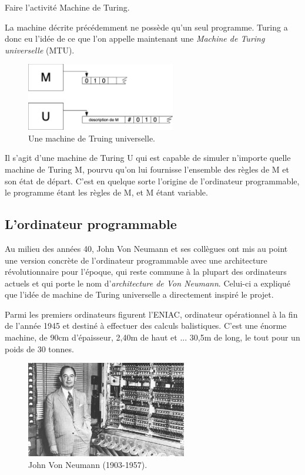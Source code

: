 \begin{exercice}[]
    Faire l'activité \og Machine de Turing\fg.
\end{exercice}

La machine décrite précédemment ne possède qu'un seul programme. Turing a donc eu l'idée de ce que l'on appelle maintenant une
\textit{Machine de Turing universelle} (MTU).

\begin{figure}[H]
    \begin{center}
        \includegraphics[width=6.5cm]{img/mtu.png}
    \end{center}
    \caption*{Une machine de Truing universelle.}
\end{figure}

Il s'agit d'une machine de Turing U qui est capable de simuler n'importe quelle machine de Turing M,
pourvu qu'on lui fournisse l'ensemble des règles de M et son état de départ. C'est en quelque sorte l'origine de l'ordinateur
programmable, le programme étant les règles de M, et M étant variable.

\subsection{L'ordinateur programmable}

Au milieu des années 40, John Von Neumann et ses collègues ont mis au point une version concrète de l'ordinateur programmable avec une architecture révolutionnaire pour l'époque, qui reste commune à la plupart des ordinateurs actuels et qui porte le nom d'\textit{architecture de Von Neumann}. Celui-ci a expliqué que l'idée de machine de Turing universelle a directement inspiré le projet.

Parmi les premiers ordinateurs figurent l'ENIAC, ordinateur opérationnel à la fin de l'année 1945 et destiné à effectuer des calculs balistiques. C'est une énorme machine, de 90cm d'épaisseur, 2,40m de haut et ... 30,5m de long, le tout pour un poids de 30 tonnes.

\begin{figure}[H]
    \begin{center}
        \includegraphics[width=7cm]{img/vonneumann}
    \end{center}
    \caption*{John Von Neumann (1903-1957).}
\end{figure}

